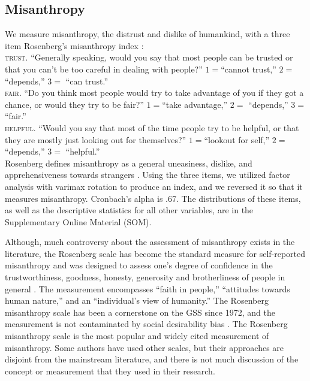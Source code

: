 \documentclass[11pt, letterpaper]{article}
\begin{document}
\begin{spacing}{1.4}
\subsection*{Misanthropy}

We measure misanthropy, the distrust and dislike of humankind, with a three item  Rosenberg's  misanthropy index \citep{rosenberg56,smith97}:\\

\indent\textsc{trust}. ``Generally speaking, would you say that most people can be trusted or that you can't be too
careful in dealing with people?''  $1=$``cannot trust,'' $2=$     ``depends,'' $3=$   ``can trust.''\\
\indent\textsc{fair}. ``Do you think most people would try to take advantage of you if they got a chance, or
would they try to be fair?'' $1=$``take advantage,'' $2=$       ``depends,'' $3=$          ``fair.'' \\
\indent\textsc{helpful}. ``Would you say that most of the time people try to be helpful, or that they are mostly just
looking out for themselves?'' $1=$``lookout for self,'' $2=$       ``depends,'' $3=$        ``helpful.''\\ 

Rosenberg defines misanthropy as a general uneasiness, dislike, and
apprehensiveness towards strangers \citep{rosenberg56}. Using the three items,
we utilized factor analysis with varimax rotation to produce an index, and we
reversed it so that it measures misanthropy. Cronbach's alpha is .67. The
distributions of these items, as well as the descriptive statistics for all other variables, are in the Supplementary Online Material (SOM).

 Although, much controversy about the assessment of misanthropy exists in the
 literature, the Rosenberg scale has become the standard measure for
 self-reported misanthropy and was designed to assess one's degree of confidence
 in the trustworthiness, goodness, honesty, generosity and brotherliness of
 people in general \citep{rosenberg56}. The measurement encompasses ``faith in
 people,'' ``attitudes towards human nature,'' and an ``individual's view of
 humanity.'' The Rosenberg misanthropy scale has been a cornerstone on the GSS since 1972, and the measurement is not contaminated by social desirability bias \citep{ray81}. 
 The Rosenberg misanthropy scale is the most popular and widely cited measurement of misanthropy. Some authors \citep[e.g.,][]{wuensch2002misanthropy} have used other scales, but their approaches are disjoint from the mainstream literature, and there is not much discussion of the concept or measurement that they used in their research.  


\end{spacing}
\end{document}
